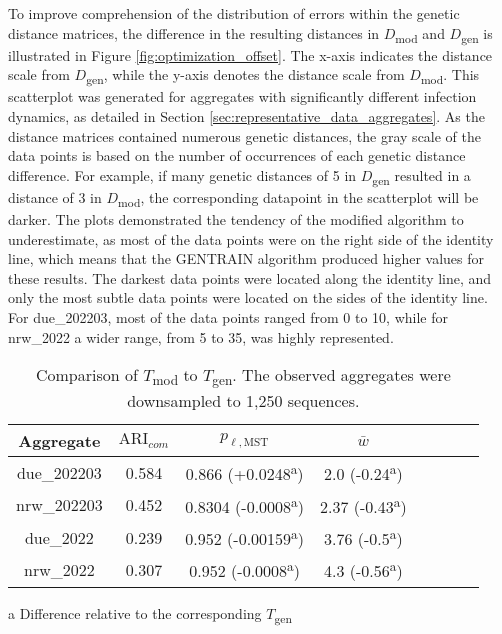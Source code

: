 To improve comprehension of the distribution of errors within the genetic distance matrices, the difference in the resulting distances in $D$\textsubscript{mod} and $D$\textsubscript{gen} is illustrated in Figure \ref{fig:optimization_offset}. The x-axis indicates the distance scale from $D$\textsubscript{gen}, while the y-axis denotes the distance scale from $D$\textsubscript{mod}. This scatterplot was generated for aggregates with significantly different infection dynamics, as detailed in Section \ref{sec:representative_data_aggregates}. As the distance matrices contained numerous genetic distances, the gray scale of the data points is based on the number of occurrences of each genetic distance difference. For example, if many genetic distances of 5 in $D$\textsubscript{gen} resulted in a distance of 3 in $D$\textsubscript{mod}, the corresponding datapoint in the scatterplot will be darker. The plots demonstrated the tendency of the modified algorithm to underestimate, as most of the data points were on the right side of the identity line, which means that the GENTRAIN algorithm produced higher values for these results. The darkest data points were located along the identity line, and only the most subtle data points were located on the sides of the identity line. For due\_202203, most of the data points ranged from 0 to 10, while for nrw\_2022 a wider range, from 5 to 35, was highly represented. 

\begin{table}[H]
        \caption[Comparison of $T$\textsubscript{mod} to $T$\textsubscript{gen}]{Comparison of $T$\textsubscript{mod} to $T$\textsubscript{gen}. The observed aggregates were downsampled to 1,250 sequences.}
        \centering
        \begin{threeparttable}
        \begin{tabular}{ Sc | Sc Sc Sc } 
        Aggregate & $\text{ARI}_{com}$ & $p_{\ell,{\text{MST}}}$ & $\bar w$ \\
        \hline\hline
        due\_202203 & 0.584 & 0.866 (+0.0248\textsuperscript{a}) & 2.0 (-0.24\textsuperscript{a})\\
        nrw\_202203 & 0.452 & 0.8304 (-0.0008\textsuperscript{a}) & 2.37 (-0.43\textsuperscript{a}) \\
        due\_2022 & 0.239 & 0.952 (-0.00159\textsuperscript{a}) & 3.76 (-0.5\textsuperscript{a})\\
        nrw\_2022 & 0.307 & 0.952 (-0.0008\textsuperscript{a}) &  4.3 (-0.56\textsuperscript{a})\\
        \end{tabular}
                    \begin{tablenotes}[flushleft]
                \small
                \item[a] Difference relative to the corresponding  $T$\textsubscript{gen}
            \end{tablenotes}
        \end{threeparttable}
        \label{table:algorithm_optimization_mst_evaluation}
\end{table}

